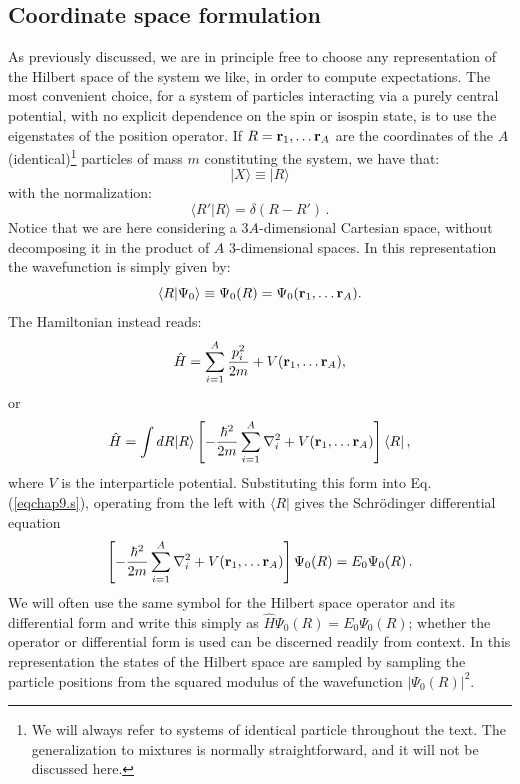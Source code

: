 \subsection{Coordinate space formulation}
As previously discussed, we are in principle free to choose any representation of the Hilbert
space of the system we like, in order to compute expectations. The most convenient choice, for a system of particles interacting via a purely central potential, with no explicit dependence on the spin or isospin state, is to use the eigenstates of the
position operator. If $R={{\bf r}_1,\dots{\bf r}_A}$ are the coordinates of the $A$ 
(identical)\footnote{We will always refer to systems of identical particle throughout the text. The generalization to mixtures is normally straightforward, and it will not be discussed here.} particles of mass $m$ constituting the system, we have that:
\begin{equation}
\vert X\rangle \equiv \vert R \rangle
\end{equation}
with the normalization:
\begin{equation}
\langle R'\vert R\rangle = \delta(R-R') \,.
\end{equation}
Notice that we are here considering a $3A$-dimensional Cartesian space, without decomposing it
in the product of $A$ $3$-dimensional spaces. In this representation the wavefunction 
is simply given by:
\begin{equation}
\langle R\vert\Psi_0\rangle \equiv \Psi_0(R)=\Psi_0({\bf r}_1,\dots{\bf r}_A).
\end{equation}
The Hamiltonian instead reads:
\begin{equation}
\hat{H}=\sum_{i=1}^A \frac{p_i^2}{2m}
+V({\bf r}_1,\dots{\bf r}_A),
\end{equation}
or
\begin{equation}
\hat{H} = \int dR \vert R\rangle
\left [
-\frac{\hbar^2}{2m}\sum_{i=1}^A \nabla^2_i +V({\bf r}_1,\dots{\bf r}_A)
\right ] \langle R\vert\,,
\end{equation}
where $V$ is the interparticle potential. 
Substituting this form into Eq. (\ref{eqchap9.s}), operating from the
left with $\langle R\vert$ gives the Schr\"odinger differential equation
\begin{equation}
\left [
-\frac{\hbar^2}{2m}\sum_{i=1}^A \nabla^2_i +V({\bf r}_1,\dots{\bf r}_A)
\right ] \Psi_0(R) = E_0\Psi_0(R) \,.
\end{equation}
We will often use the same symbol for the Hilbert space operator
and its differential form and write this simply as
$\hat H\Psi_0(R)=E_0\Psi_0(R)$; whether the
operator or differential form is used can be discerned readily
from context.
In this representation the states of the Hilbert space are sampled by sampling the particle
positions from the squared modulus of the wavefunction $\vert\Psi_0(R)\vert^2$. 

